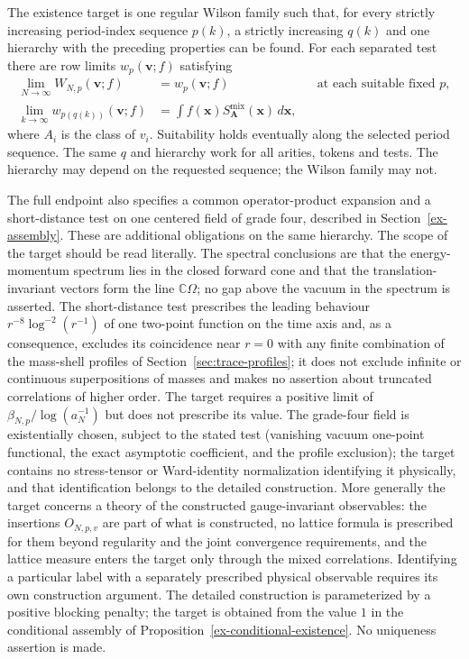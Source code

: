The existence target is one regular Wilson family such that, for every
strictly increasing period-index sequence \(p(k)\), a strictly increasing
\(q(k)\) and one hierarchy with the preceding properties can be found.
For each separated test there are row limits \(w_p(\boldsymbol v;f)\)
satisfying
\begin{align}
 \lim_{N\to\infty}W_{N,p}(\boldsymbol v;f)
   &=w_p(\boldsymbol v;f)
       &&\text{at each suitable fixed }p,\label{ex-row-target}\\
 \lim_{k\to\infty}w_{p(q(k))}(\boldsymbol v;f)
   &=\int f(\boldsymbol x)
           S^{\mathrm{mix}}_{\boldsymbol A}(\boldsymbol x)\,d\boldsymbol x,
       \label{ex-volume-target}
\end{align}
where \(A_i\) is the class of \(v_i\). Suitability holds eventually
along the selected period sequence. The same \(q\) and hierarchy work for
all arities, tokens and tests. The hierarchy may depend on the requested
sequence; the Wilson family may not.

The full endpoint also specifies a common operator-product expansion and a
short-distance test on one centered field of grade four, described in
Section~\ref{ex-assembly}. These are additional obligations on the same
hierarchy. The scope of the target should be read literally. The spectral
conclusions are that the energy-momentum spectrum lies in the closed forward
cone and that the translation-invariant vectors form the line
\(\mathbb C\Omega\); no gap above the vacuum in the spectrum is asserted.
The short-distance test prescribes the leading behaviour
\(r^{-8}\log^{-2}(r^{-1})\) of one two-point function on the time axis and,
as a consequence, excludes its coincidence near \(r=0\) with any finite
combination of the mass-shell profiles of Section~\ref{sec:trace-profiles};
it does not exclude infinite or continuous superpositions of masses and makes
no assertion about truncated correlations of higher order. The target
requires a positive limit of \(\beta_{N,p}/\log(a_N^{-1})\) but does not
prescribe its value. The grade-four field is existentially chosen, subject
to the stated test (vanishing vacuum one-point functional, the exact
asymptotic coefficient, and the profile exclusion); the target contains no
stress-tensor or Ward-identity normalization identifying it physically, and
that identification belongs to the detailed construction. More generally the
target concerns a theory of the constructed gauge-invariant observables: the
insertions \(O_{N,p,v}\) are part of what is constructed, no lattice formula
is prescribed for them beyond regularity and the joint convergence
requirements, and the lattice measure enters the target only through the
mixed correlations. Identifying a particular label with a separately
prescribed physical observable requires its own construction argument.
The detailed construction is parameterized by a positive blocking penalty;
the target is obtained from the value \(1\) in the conditional assembly of
Proposition~\ref{ex-conditional-existence}. No uniqueness assertion is made.

